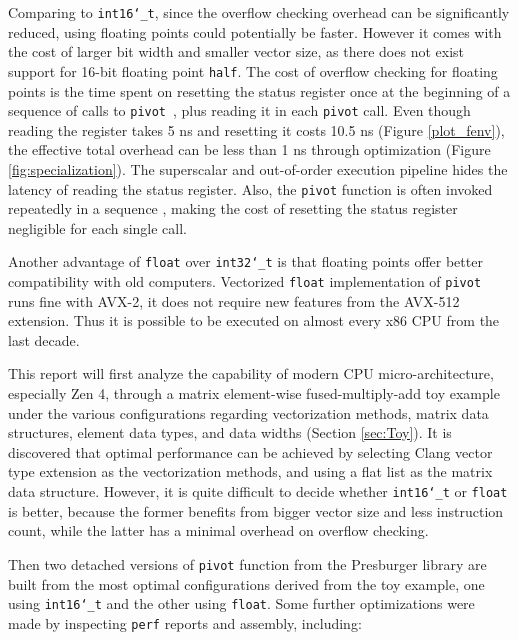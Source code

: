 \documentclass[logo,bsc,singlespacing,parskip]{infthesis}
\newcommand{\dtshort}{\texttt{int16\char`_t}}
\newcommand{\dtint}{\texttt{int32\char`_t}}
\newcommand{\dtfloat}{\texttt{float}}
\newcommand{\pivot}{\texttt{pivot}}
\begin{document}
Comparing to \dtshort{}, since the overflow checking overhead can be
significantly reduced, using floating points could potentially be faster.
However it comes with the cost of larger bit width and smaller vector size, as
there does not exist support for 16-bit floating point \texttt{half}. The cost
of overflow checking for floating points is the time spent on resetting the
status register once at the beginning of a sequence of calls to
\pivot{}~\cite{FPL1}, plus reading it in each \pivot{} call. Even though reading
the register takes 5 ns and resetting it costs 10.5 ns (Figure \ref{plot_fenv}),
the effective total overhead can be less than 1 ns through optimization (Figure
\ref{fig:specialization}). The superscalar and out-of-order execution pipeline
hides the latency of reading the status register. Also, the \pivot{} function is
often invoked repeatedly in a sequence \cite{FPL1}, making the cost of resetting
the status register negligible for each single call. 



Another advantage of \dtfloat{} over \dtint{} is that floating points offer
better compatibility with old computers. Vectorized \dtfloat{} implementation of
\pivot{} runs fine with AVX-2, it does not require new features from the AVX-512
extension. Thus it is possible to be executed on almost every x86 CPU from the
last decade. 

This report will first analyze the capability of modern CPU micro-architecture,
especially Zen 4, through a matrix element-wise fused-multiply-add toy
example under the various configurations regarding vectorization methods, matrix
data structures, element data types, and data widths (Section \ref{sec:Toy}). 
It is discovered that optimal performance can be achieved by selecting Clang
vector type extension as the vectorization methods, and using a flat list as the
matrix data structure. However, it is quite difficult to decide whether
\dtshort{} or \dtfloat{} is better, because the former benefits from bigger
vector size and less instruction count, while the latter has a minimal overhead
on overflow checking. 

Then two detached versions of \texttt{pivot} function from the Presburger
library are built from the most optimal configurations derived from the toy
example, one using \dtshort{} and the other using \dtfloat{}. Some
further optimizations were made by inspecting \texttt{perf} reports and
assembly, including: 
\end{document}
